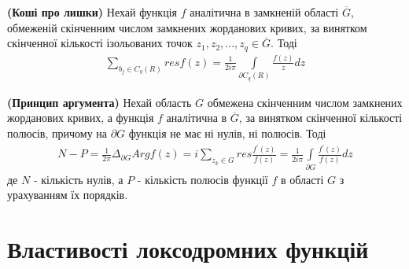 \documentclass[12pt,a4paper]{article}
\begin{document}
\begin{thmNoNum}
\textbf{(Коші про лишки)}\label{thKoshi}
 Нехай функція $f$ аналітична в замкненій області $\overline{G}$, обмеженій скінченним числом замкнених жорданових кривих, за винятком скінченної кількості ізольованих точок $z_{1}, z_{2},...,z_{q}\in \overline{G}$. Тоді
 \[\begin{array}{l}
\sum \limits_{ b_{j}\in C_{q}(R)} resf(z)= \frac{1}{2i\pi}\int \limits_{\partial C_{q}(R)} \frac{f(z)}{z}dz
\end{array} \]
\end{thmNoNum}
\vspace{1,5cm}

\begin{thmNoNum}
\textbf{(Принцип аргумента)}\label{prArg}
 Нехай область $G$ обмежена скінченним числом замкнених жорданових кривих, а функція $f$ аналітична в $\overline{G}$, за винятком скінченної кількості полюсів, причому на $\partial G$  функція не має ні нулів, ні полюсів. Тоді
\[\begin{array}{l}                    
N-P=\frac{1}{2\pi} \Delta_{\partial G} Arg f(z) =i\sum\limits_{z_k\in G} res \frac{f^{'}(z)}{f(z)} = \frac{1}{2i\pi}\int\limits_{\partial G}^{ }\frac{f^{'}(z)}{f(z)} dz 
\end{array}\]
де $N$ - кількість нулів, а $P$ - кількість полюсів функції $f$ в області $G$ з урахуванням їх порядків.
\end{thmNoNum}
\vspace{1,5cm}
\clearpage
\section{Властивості локсодромних функцій}
\end{document}
